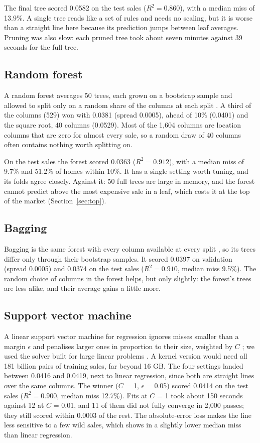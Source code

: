 \documentclass[sigconf,nonacm,10pt]{acmart}
\begin{document}
The final tree scored 0.0582 on the test sales ($R^2 = 0.860$), with a median miss of 13.9\%. A single tree reads like a set of rules and needs no scaling, but it is worse than a straight line here because its prediction jumps between leaf averages. Pruning was also slow: each pruned tree took about seven minutes against 39 seconds for the full tree.

\subsection{Random forest}
A random forest averages 50 trees, each grown on a bootstrap sample and allowed to split only on a random share of the columns at each split \cite{breiman2001}. A third of the columns (529) won with 0.0381 (spread 0.0005), ahead of 10\% (0.0401) and the square root, 40 columns (0.0529). Most of the 1,604 columns are location columns that are zero for almost every sale, so a random draw of 40 columns often contains nothing worth splitting on.

On the test sales the forest scored 0.0363 ($R^2 = 0.912$), with a median miss of 9.7\% and 51.2\% of homes within 10\%. It has a single setting worth tuning, and its folds agree closely. Against it: 50 full trees are large in memory, and the forest cannot predict above the most expensive sale in a leaf, which costs it at the top of the market (Section~\ref{sec:top}).

\subsection{Bagging}
Bagging is the same forest with every column available at every split \cite{breiman1996}, so its trees differ only through their bootstrap samples. It scored 0.0397 on validation (spread 0.0005) and 0.0374 on the test sales ($R^2 = 0.910$, median miss 9.5\%). The random choice of columns in the forest helps, but only slightly: the forest's trees are less alike, and their average gains a little more.

\subsection{Support vector machine}
A linear support vector machine for regression ignores misses smaller than a margin $\epsilon$ and penalises larger ones in proportion to their size, weighted by $C$ \cite{cortes1995}; we used the solver built for large linear problems \cite{ho2012}. A kernel version would need all 181 billion pairs of training sales, far beyond 16 GB. The four settings landed between 0.0416 and 0.0419, next to linear regression, since both are straight lines over the same columns. The winner ($C$ = 1, $\epsilon$ = 0.05) scored 0.0414 on the test sales ($R^2 = 0.900$, median miss 12.7\%). Fits at $C$ = 1 took about 150 seconds against 12 at $C$ = 0.01, and 11 of them did not fully converge in 2,000 passes; they still scored within 0.0003 of the rest. The absolute-error loss makes the line less sensitive to a few wild sales, which shows in a slightly lower median miss than linear regression.
\end{document}
